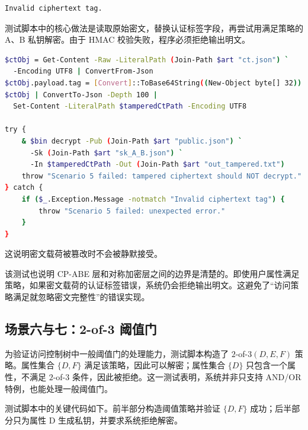 \begin{lstlisting}[caption={密文篡改时的错误信息}]
Invalid ciphertext tag.
\end{lstlisting}

测试脚本中的核心做法是读取原始密文，替换认证标签字段，再尝试用满足策略的 A、B 私钥解密。由于 HMAC 校验失败，程序必须拒绝输出明文。

\begin{lstlisting}[language=bash,caption={密文篡改场景测试代码}]
$ctObj = Get-Content -Raw -LiteralPath (Join-Path $art "ct.json") `
  -Encoding UTF8 | ConvertFrom-Json
$ctObj.payload.tag = [Convert]::ToBase64String((New-Object byte[] 32))
$ctObj | ConvertTo-Json -Depth 100 |
  Set-Content -LiteralPath $tamperedCtPath -Encoding UTF8

try {
    & $bin decrypt -Pub (Join-Path $art "public.json") `
      -Sk (Join-Path $art "sk_A_B.json") `
      -In $tamperedCtPath -Out (Join-Path $art "out_tampered.txt")
    throw "Scenario 5 failed: tampered ciphertext should NOT decrypt."
} catch {
    if ($_.Exception.Message -notmatch "Invalid ciphertext tag") {
        throw "Scenario 5 failed: unexpected error."
    }
}
\end{lstlisting}

这说明密文载荷被篡改时不会被静默接受。

该测试也说明 CP-ABE 层和对称加密层之间的边界是清楚的。即使用户属性满足策略，如果密文载荷的认证标签错误，系统仍会拒绝输出明文。这避免了“访问策略满足就忽略密文完整性”的错误实现。

\subsection{场景六与七：2-of-3 阈值门}

为验证访问控制树中一般阈值门的处理能力，测试脚本构造了 $2$-of-$3(D,E,F)$ 策略。属性集合 $\{D,F\}$ 满足该策略，因此可以解密；属性集合 $\{D\}$ 只包含一个属性，不满足 $2$-of-$3$ 条件，因此被拒绝。这一测试表明，系统并非只支持 AND/OR 特例，也能处理一般阈值门。

测试脚本中的关键代码如下。前半部分构造阈值策略并验证 $\{D,F\}$ 成功；后半部分只为属性 D 生成私钥，并要求系统拒绝解密。

